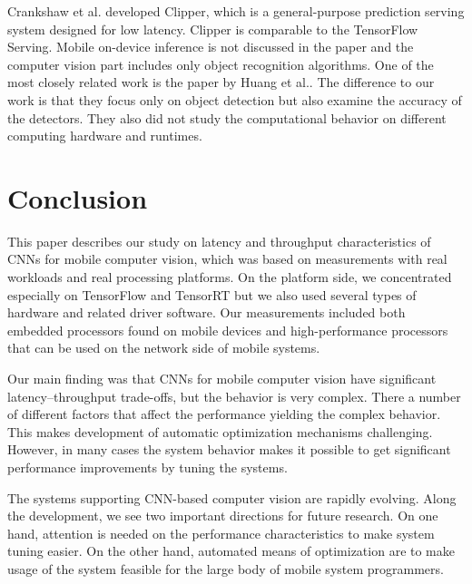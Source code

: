 \documentclass[sigconf]{acmart}
\begin{document}
Crankshaw et al.\cite{crankshaw17nsdi} developed Clipper, which is a general-purpose prediction serving system designed for low latency. Clipper is comparable to the TensorFlow Serving.
Mobile on-device inference is not discussed in the paper and the computer vision part includes only object recognition algorithms. One of the most closely related work is the paper by Huang et al.\cite{Huang2017CVPR}. The difference to our work is that they focus only on object detection but also examine the accuracy of the detectors. They also did not study the computational behavior on different computing hardware and runtimes.



\section{Conclusion}
\label{sec:conclusion}

This paper describes our study on latency and throughput characteristics of CNNs for mobile computer vision, which was based on measurements with real workloads and real processing platforms. On the platform side, we concentrated especially on TensorFlow and TensorRT but we also used several types of hardware and related driver software. Our measurements included both embedded processors found on mobile devices and high-performance processors that can be used on the network side of mobile systems.

Our main finding was that CNNs for mobile computer vision have significant latency--throughput trade-offs, but the behavior is very complex. There a number of different factors that affect the performance yielding the complex behavior. This makes development of automatic optimization mechanisms challenging. However, in many cases the system behavior makes it possible to get significant performance improvements by tuning the systems.

The systems supporting CNN-based computer vision are rapidly evolving. Along the development, we see two important directions for future research. On one hand, attention is needed on the performance characteristics to make system tuning easier. On the other hand, automated means of optimization are to make usage of the system feasible for the large body of mobile system programmers.






\end{document}
